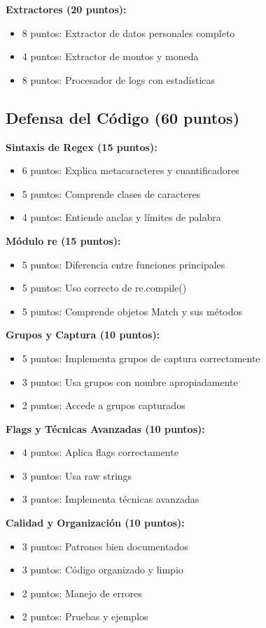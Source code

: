 \documentclass[11pt,letterpaper]{article}
\begin{document}
\textbf{Extractores (20 puntos):}
\begin{itemize}
    \item 8 puntos: Extractor de datos personales completo
    \item 4 puntos: Extractor de montos y moneda
    \item 8 puntos: Procesador de logs con estadísticas
\end{itemize}

\subsection{Defensa del Código (60 puntos)}

\textbf{Sintaxis de Regex (15 puntos):}
\begin{itemize}
    \item 6 puntos: Explica metacaracteres y cuantificadores
    \item 5 puntos: Comprende clases de caracteres
    \item 4 puntos: Entiende anclas y límites de palabra
\end{itemize}

\textbf{Módulo re (15 puntos):}
\begin{itemize}
    \item 5 puntos: Diferencia entre funciones principales
    \item 5 puntos: Uso correcto de re.compile()
    \item 5 puntos: Comprende objetos Match y sus métodos
\end{itemize}

\textbf{Grupos y Captura (10 puntos):}
\begin{itemize}
    \item 5 puntos: Implementa grupos de captura correctamente
    \item 3 puntos: Usa grupos con nombre apropiadamente
    \item 2 puntos: Accede a grupos capturados
\end{itemize}

\textbf{Flags y Técnicas Avanzadas (10 puntos):}
\begin{itemize}
    \item 4 puntos: Aplica flags correctamente
    \item 3 puntos: Usa raw strings
    \item 3 puntos: Implementa técnicas avanzadas
\end{itemize}

\textbf{Calidad y Organización (10 puntos):}
\begin{itemize}
    \item 3 puntos: Patrones bien documentados
    \item 3 puntos: Código organizado y limpio
    \item 2 puntos: Manejo de errores
    \item 2 puntos: Pruebas y ejemplos
\end{itemize}
\end{document}
